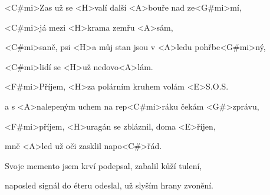 

\zs
<C#mi>Zas už se <H>valí další <A>bouře nad ze<G#mi>mí,

<C#mi>já mezi <H>krama zemřu <A>sám,

<C#mi>saně, psi <H>a můj stan jsou v <A>ledu pohřbe<G#mi>ný,

<C#mi>lidí se <H>už nedovo<A>lám.
\ks

\zr
<F#mi>Příjem, <H>za polárním kruhem volám <E>S.O.S.

a s <A>nalepeným uchem na rep<C#mi>ráku čekám <G#>zprávu,

<F#mi>příjem, <H>uragán se zbláznil, doma <E>říjen,

mně <A>led už oči zasklil napo<C#>řád.
\kr

\zs
Svoje memento jsem krví podepsal, zabalil kůží tulení,

naposled signál do éteru odeslal, už slyším hrany zvonění.
\ks

\zr\kr

\kp
